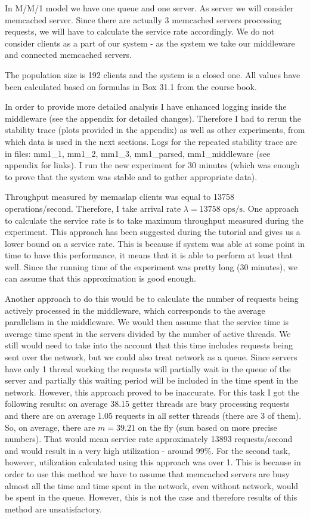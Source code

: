 \documentclass[11pt]{article}
\begin{document}
In M/M/1 model we have one queue and one server. As server we will consider memcached server. Since there are actually 3 memcached servers processing requests, we will have to calculate the service rate accordingly. We do not consider clients as a part of our system - as the system we take our middleware and connected memcached servers.

The population size is 192 clients and the system is a closed one. All values have been calculated based on formulas in Box 31.1 from the course book.

In order to provide more detailed analysis I have enhanced logging inside the middleware (see the appendix for detailed changes). Therefore I had to rerun the stability trace (plots provided in the appendix) as well as other experiments, from which data is used in the next sections. Logs for the repeated stability trace are in files: mm1\_1, mm1\_2, mm1\_3, mm1\_parsed, mm1\_middleware (see appendix for links). I run the new experiment for 30 minutes (which was enough to prove that the system was stable and to gather appropriate data).

Throughput measured by memaslap clients was equal to 13758 operations/second. Therefore, I take arrival rate $\lambda = 13758 \textrm{ ops/s}$. One approach to calculate the service rate is to take maximum throughput measured during the experiment. This approach has been suggested during the tutorial and gives us a lower bound on a service rate. This is because if system was able at some point in time to have this performance, it means that it is able to perform at least that well. Since the running time of the experiment was pretty long (30 minutes), we can assume that this approximation is good enough.

Another approach to do this would be to calculate the number of requests being actively processed in the middleware, which corresponds to the average parallelism in the middleware. We would then assume that the service time is average time spent in the servers divided by the number of active threads. We still would need to take into the account that this time includes requests being sent over the network, but we could also treat network as a queue. Since servers have only 1 thread working the requests will partially wait in the queue of the server and partially this waiting period will be included in the time spent in the network. However, this approach proved to be inaccurate. For this task I got the following results: on average 38.15 getter threads are busy processing requests and there are on average 1.05 requests in all setter threads (there are 3 of them). So, on average, there are $m = 39.21$ on the fly (sum based on more precise numbers). That would mean service rate approximately 13893 requests/second and would result in a very high utilization - around 99\%. For the second task, however, utilization calculated using this approach was over 1. This is because in order to use this method we have to assume that memcached servers are busy almost all the time and time spent in the network, even without network, would be spent in the queue. However, this is not the case and therefore results of this method are unsatisfactory. 
\end{document}

